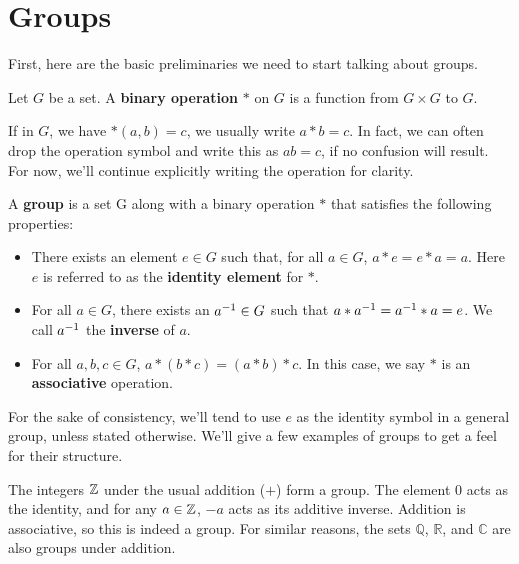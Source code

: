 \section{Groups}

First, here are the basic preliminaries we need to start talking about groups.

\begin{definition}
\label{binaryoperation}
Let $G$ be a set. A \textbf{binary operation} $*$ on $G$ is a function from $G \times G$ to $G$.
\end{definition}

If in $G$, we have $*(a, b) = c$, we usually write $a * b = c$. In fact, we can often drop the operation symbol and write this as $ab = c$, if no confusion will result. For now, we'll continue explicitly writing the operation for clarity.


\begin{definition}
A \textbf{group} is a set G along with a binary operation $*$ that satisfies the following properties:
\begin{itemize}
    \item There exists an element $e \in G$ such that, for all $a \in G$, $a*e = e*a = a$. Here $e$ is referred to as the \textbf{identity element} for $*$.
    \item For all $a \in G$, there exists an $a^{-1} \in G$ such that $a*a^{-1} = a^{-1}*a = e$. We call $a^{-1}$ the \textbf{inverse} of $a$.
    \item For all $a, b, c \in G$, $a * (b * c) = (a * b) * c$. In this case, we say $*$ is an \textbf{associative} operation.
\end{itemize}
\end{definition}

For the sake of consistency, we'll tend to use $e$ as the identity symbol in a general group, unless stated otherwise. We'll give a few examples of groups to get a feel for their structure.

\begin{example}
The integers $\mathbb{Z}$ under the usual addition ($+$) form a group. The element $0$ acts as the identity, and for any $a \in \mathbb{Z}$, $-a$ acts as its additive inverse. Addition is associative, so this is indeed a group. For similar reasons, the sets $\mathbb{Q}$, $\mathbb{R}$, and $\mathbb{C}$ are also groups under addition.
\end{example}

